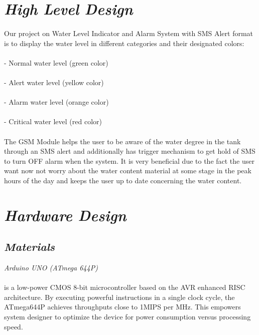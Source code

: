 \documentclass[11pt]{article}
\begin{document}
\section{\emph{High Level Design}}
\paragraph{} { Our project on Water Level Indicator and Alarm System with SMS Alert format is to display the water level in different categories and their designated colors:

\paragraph{}- Normal water level {(green color)} 
\paragraph{}- Alert water level {(yellow color)} 
\paragraph{}- Alarm water level {(orange color)}
\paragraph{}- Critical water level {(red color)}

\paragraph{}  The GSM Module helps the user to be aware of the water degree in the tank through an SMS alert and additionally has trigger mechanism to get hold of SMS to turn OFF alarm when the system. It is very beneficial due to the fact the user want now not worry about the water content material at some stage in the peak hours of the day and keeps the user up to date concerning the water content.}

\section{\emph{Hardware Design}}
\subsection{\emph{Materials}} 

\textit{\Large Arduino UNO (ATmega 644P)}
\paragraph{} {\Large is a low-power CMOS 8-bit microcontroller based on the AVR enhanced RISC architecture. By executing powerful instructions in a single clock cycle, the ATmega644P achieves throughputs close to 1MIPS per MHz. This empowers system designer to optimize the device for power consumption versus processing speed.}
\end{document}
